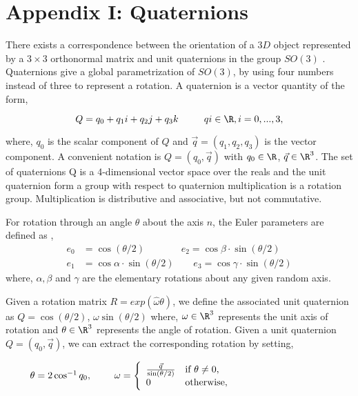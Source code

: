 \chapter{Appendix I: Quaternions}

There exists a correspondence between the orientation of a $ 3D $ object represented by a $ 3 \times 3 $ orthonormal matrix and unit quaternions in the group $ SO(3) $ \citep{Murray}. Quaternions give a global parametrization of $ SO(3) $, by using four numbers instead of three to represent a rotation. A quaternion is a vector quantity of the form,

  \[Q=q_{0} + q_{1}i + q_{2}j + q_{3}k  \ \ \ \ \ \ \ \  qi \in \R, i = 0, . . . , 3,\] 
                            
where, $ q_{0} $ is the scalar component of $ Q $ and $ \vec{q}= (q_{1}, q_{2}, q_{3}) $ is the vector component. A convenient notation is $ Q = (q_{0}, \vec{q}) $ with $ q_{0} \in \R $, $ \vec{q} \in \R^{3} $.
The set of quaternions Q is a 4-dimensional vector space over the reals and the unit quaternion form a group with respect to quaternion multiplication is a rotation group. Multiplication is distributive and associative, but not commutative.

For rotation through an angle $ \theta $ about the axis $ n $, the Euler parameters are defined as \citep{Hanson},
\begin{align*}
e_{0}&=\cos(\theta / 2) \ \ \ \ \ \ \ \ \ \ \ \ \ \ \ \ \ e_{2}=\cos \beta \cdot\sin (\theta / 2)\\
e_{1}&=\cos \alpha \cdot\sin (\theta / 2) \ \ \ \ \ \ \ \ \ e_{3}=\cos \gamma \cdot\sin (\theta / 2)
\end{align*}
where, $ \alpha, \beta $ and $ \gamma $ are the elementary rotations about any given random axis.

Given a rotation matrix $ R=exp\left(\hat{\omega}\theta \right) $, we define the associated unit quaternion as 
$ Q = \cos (\theta / 2) $,  $ \omega\sin (\theta / 2) $
where, $ \omega \in \R^{3} $ represents the unit axis of rotation and $ \theta \in \R^{3} $ represents the angle of rotation.
Given a unit quaternion $ Q = \left(q_{0}, \vec{q} \right) $, we can extract the corresponding rotation by setting,

\begin{center}
\ \ \ \ \ $\theta = 2\cos ^{-1} q_{0}, \ \ \ \ \ \ \ 
\omega = \left\lbrace
\begin{array}{ll}
\frac{\vec{q}}{\sin (\theta / 2)} & \mbox{if $ \theta \neq 0,$}\\
0 & \mbox{otherwise,}
\end{array}
\right.\
$
\end{center}

